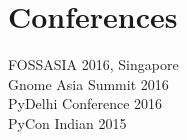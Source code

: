 \documentclass[]{deedy-resume-openfont}
\begin{document}
\begin{minipage}[t]{0.33\textwidth}

\section{Conferences}
FOSSASIA 2016, Singapore \\
\textbullet{} Gnome Asia Summit 2016 \\
\textbullet{} PyDelhi Conference 2016 \\
\textbullet{} PyCon Indian 2015
\sectionsep

%
%

\end{minipage} 
\hfill
\end{document}
